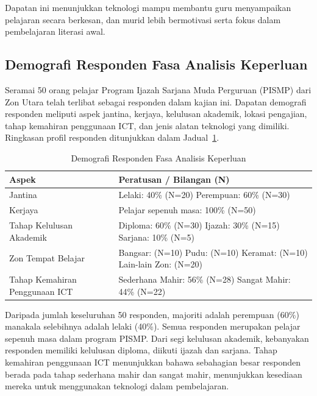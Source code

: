 {{Dapatan ini menunjukkan teknologi mampu membantu guru menyampaikan pelajaran secara berkesan, dan murid lebih bermotivasi serta fokus dalam pembelajaran literasi awal.

\subsection{Demografi Responden Fasa Analisis Keperluan}

Seramai 50 orang pelajar Program Ijazah Sarjana Muda Perguruan (PISMP) dari Zon Utara telah terlibat sebagai responden dalam kajian ini. Dapatan demografi responden meliputi aspek jantina, kerjaya, kelulusan akademik, lokasi pengajian, tahap kemahiran penggunaan ICT, dan jenis alatan teknologi yang dimiliki. Ringkasan profil responden ditunjukkan dalam Jadual~\ref{jadual:demografiResponden}.

\begin{table}[H]
\centering
\caption{Demografi Responden Fasa Analisis Keperluan}
\label{jadual:demografiResponden}
\begin{tabular}{|p{6cm}|p{6cm}|}
\hline
\textbf{Aspek} & \textbf{Peratusan / Bilangan (N)} \\
\hline
Jantina & Lelaki: 40\% (N=20) \newline Perempuan: 60\% (N=30) \\
\hline
Kerjaya & Pelajar sepenuh masa: 100\% (N=50) \\
\hline
Tahap Kelulusan Akademik & Diploma: 60\% (N=30) \newline Ijazah: 30\% (N=15) \newline Sarjana: 10\% (N=5) \\
\hline
Zon Tempat Belajar & Bangsar: (N=10) \newline Pudu: (N=10) \newline Keramat: (N=10) \newline Lain-lain Zon: (N=20) \\
\hline
Tahap Kemahiran Penggunaan ICT & Sederhana Mahir: 56\% (N=28) \newline Sangat Mahir: 44\% (N=22) \\
\hline
\end{tabular}
\end{table}

Daripada jumlah keseluruhan 50 responden, majoriti adalah perempuan (60\%) manakala selebihnya adalah lelaki (40\%). Semua responden merupakan pelajar sepenuh masa dalam program PISMP. Dari segi kelulusan akademik, kebanyakan responden memiliki kelulusan diploma, diikuti ijazah dan sarjana. Tahap kemahiran penggunaan ICT menunjukkan bahawa sebahagian besar responden berada pada tahap sederhana mahir dan sangat mahir, menunjukkan kesediaan mereka untuk menggunakan teknologi dalam pembelajaran.
}}
